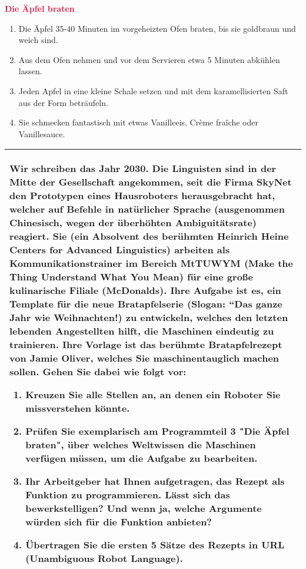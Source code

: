 \documentclass[xetex,svgnames]{scrartcl}
\newcommand{\Table}[1]{%
    \begin{flushleft}
        \begin{tabular}{|p{16.5cm}|}
            \hline \cellcolor{lightgray} \bf \pur #1
            \\\hline
        \end{tabular}
    \end{flushleft}
}
\begin{document}
\begin{flushleft}\bf \textcolor{Crimson}{Die Äpfel braten}\end{flushleft}
    \begin{enumerate}
        \item Die Äpfel 35-40 Minuten im vorgeheizten Ofen braten, bis sie
            goldbraun und weich sind.
        \item Aus dem Ofen nehmen  und vor dem Servieren etwa 5 Minuten
            abkühlen lassen. 
        \item Jeden Apfel in eine kleine Schale setzen und mit dem
            karamellisierten Saft aus der Form beträufeln. 
        \item Sie schmecken fantastisch mit etwas Vanilleeis, Crème fraîche
            oder Vanillesauce.
    \end{enumerate}
\Table{
Wir schreiben das Jahr 2030. Die Linguisten sind in der Mitte der Gesellschaft
angekommen, seit die Firma SkyNet den Prototypen eines Hausroboters
herausgebracht hat, welcher auf Befehle in natürlicher Sprache (ausgenommen
Chinesisch, wegen der überhöhten Ambiguitätsrate) reagiert. Sie (ein Absolvent
des berühmten Heinrich Heine Centers for Advanced Linguistics) arbeiten als
Kommunikationstrainer im Bereich MtTUWYM (Make the Thing Understand What You
Mean) für eine große kulinarische Filiale (McDonalds). Ihre Aufgabe ist es,
ein Template für die neue Bratapfelserie (Slogan: ``Das ganze Jahr wie
Weihnachten!) zu entwickeln, welches den letzten lebenden Angestellten hilft,
die Maschinen eindeutig zu trainieren. Ihre Vorlage ist das berühmte
Bratapfelrezept von Jamie Oliver, welches Sie maschinentauglich machen sollen.
Gehen Sie dabei wie folgt vor:
\begin{enumerate}
    \item Kreuzen Sie alle Stellen an, an denen ein Roboter Sie missverstehen
        könnte.
    \item Prüfen Sie exemplarisch am Programmteil 3 "Die Äpfel braten", über
        welches Weltwissen die Maschinen verfügen müssen, um die Aufgabe zu
        bearbeiten.
    \item Ihr Arbeitgeber hat Ihnen aufgetragen, das Rezept als Funktion zu
        programmieren. Lässt sich das bewerkstelligen? Und wenn ja, welche
        Argumente würden sich für die Funktion anbieten?
    \item Übertragen Sie die ersten 5 Sätze des Rezepts in URL (Unambiguous
        Robot Language).
\end{enumerate}
}

%
%
\end{document}
